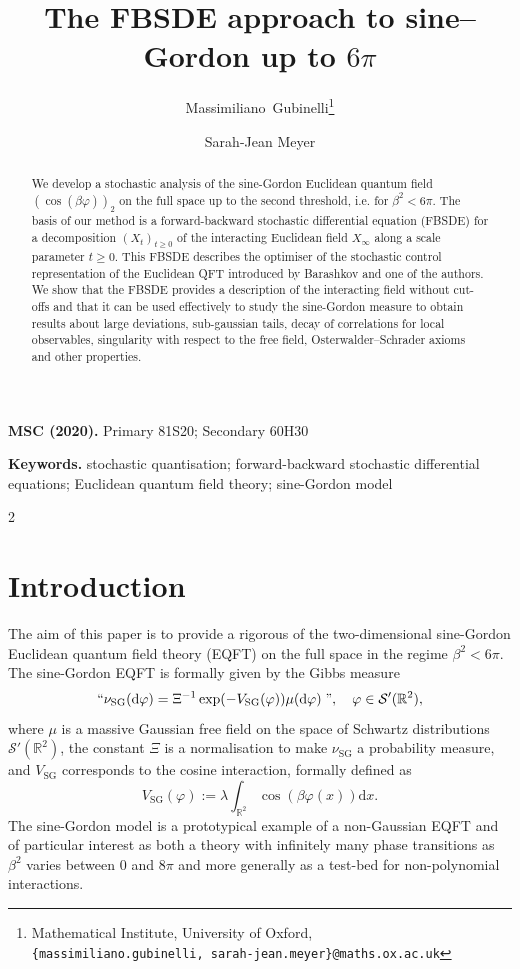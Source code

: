 \documentclass[11pt, a4paper]{scrartcl}
\title{The FBSDE approach to sine--Gordon up to $6 \pi$}
\author{
Massimiliano~Gubinelli\thanks{Mathematical Institute, University of Oxford,\\\noindent
\texttt{\{massimiliano.gubinelli, sarah-jean.meyer\}@maths.ox.ac.uk}}
\and
Sarah-Jean Meyer\footnotemark[1]
}
\date{}
\numberwithin{equation}{section}
\theoremstyle{plain}
\theoremstyle{remark}
\newcommand{\assign}{:=}
\newcommand{\mathd}{\mathrm{d}}
\newcommand{\tmop}[1]{\ensuremath{\operatorname{#1}}}
\newcommand{\tmtextit}[1]{\text{{\itshape{#1}}}}
\newcommand{\subjclass}[2][]{%
  \medskip\noindent\textbf{MSC (#1).} #2\par}
\newcommand{\keywords}[1]{%
  \medskip\noindent\textbf{Keywords.} #1\par}
\begin{document}
\maketitle

\begin{abstract}
We develop a stochastic analysis of the sine-Gordon Euclidean quantum field
  $(\cos (\beta \varphi))_2$ on the full space up to the second threshold,
  i.e. for $\beta^2 < 6 \pi$. The basis of our method is a forward-backward
  stochastic differential equation (FBSDE) for a decomposition $(X_t)_{t
  \geqslant 0}$ of the interacting Euclidean field $X_{\infty}$ along a scale
  parameter $t \geqslant 0$. This FBSDE describes the optimiser of the
  stochastic control representation of the Euclidean QFT introduced by
  Barashkov and one of the authors. We show that the FBSDE provides a
  description of the interacting field without cut-offs and that it can be
  used effectively to study the sine-Gordon measure to obtain results about
  large deviations, sub-gaussian tails, decay of correlations for local
  observables, singularity with respect to the free field,
  Osterwalder--Schrader axioms and other properties.
\end{abstract}

\subjclass[2020]{Primary 81S20; Secondary 60H30}
\keywords{
stochastic quantisation;
forward-backward stochastic differential equations;
Euclidean quantum field theory;
sine-Gordon model}


\begingroup
  \setcounter{tocdepth}{2}
  \setlength{\columnsep}{1.2em}
  \raggedcolumns
  \begin{multicols}{2}
    \tableofcontents
  \end{multicols}
\endgroup

\section{Introduction}
The aim of this paper is to provide a rigorous \tmtextit{description} of the
two-dimensional sine-Gordon Euclidean quantum field theory (EQFT) on the full
space in the regime $\beta^2 < 6 \pi$. The sine-Gordon EQFT is formally given
by the Gibbs measure
\begin{equation}
  \text{``}\nu_{\tmop{SG}} (\mathd \varphi) = \Xi^{- 1} \exp (- V_{\tmop{SG}}
  (\varphi)) \mu (\mathd \varphi) \text{{\phantom{.}}''}, \quad \varphi \in
  \mathcal{S}' (\mathbb{R}^2) \label{eq:int-Gibbs-ms},
\end{equation}
where $\mu$ is a massive Gaussian free field on the space of Schwartz
distributions $\mathcal{S}' (\mathbb{R}^2)$, the constant $\Xi$ is a
normalisation to make $\nu_{\tmop{SG}}$ a probability measure, and
$V_{\tmop{SG}}$ corresponds to the cosine interaction, formally defined as
\[ V_{\tmop{SG}} (\varphi) \assign \lambda \int_{\mathbb{R}^2} \cos (\beta
   \varphi (x)) \mathd x. \]
The sine-Gordon model is a prototypical example of a non-Gaussian EQFT and of
particular interest as both a theory with infinitely many phase transitions as
$\beta^2$ varies between $0$ and $8 \pi$ and more generally as a test-bed for
non-polynomial interactions.
\end{document}
